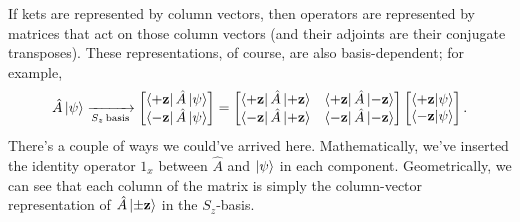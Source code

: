 \documentclass[../p116main.tex]{subfiles}
\begin{document}
If kets are represented by column vectors, then operators are represented by matrices that act on those column vectors (and their adjoints are their conjugate transposes).
These representations, of course, are also basis-dependent; for example,
\[ \hat A \left| \psi \right> \xrightarrow[{S_z \,\textrm{basis}}]{}\begin{bmatrix} \left< +\mathbf{z} \right| \hat A \left| \psi \right> \\ \left< -\mathbf{z} \right| \hat A \left| \psi \right> \end{bmatrix} = \begin{bmatrix} \left< +\mathbf{z} \right| \hat A \left| +\mathbf{z} \right> & \left< +\mathbf{z} \right| \hat A \left| -\mathbf{z} \right> \\ \left< -\mathbf{z} \right| \hat A \left| +\mathbf{z} \right> & \left< -\mathbf{z} \right| \hat A \left| -\mathbf{z} \right> \end{bmatrix} \begin{bmatrix} \left< +\mathbf{z} \middle| \psi \right> \\ \left< -\mathbf{z} \middle| \psi \right> \end{bmatrix}. \]
There's a couple of ways we could've arrived here.
Mathematically, we've inserted the identity operator $1_x$ between $\hat A$ and $\left| \psi \right>$ in each component.
Geometrically, we can see that each column of the matrix is simply the column-vector representation of $\hat A \left| \pm \mathbf{z} \right>$ in the $S_z$-basis.
\end{document}
